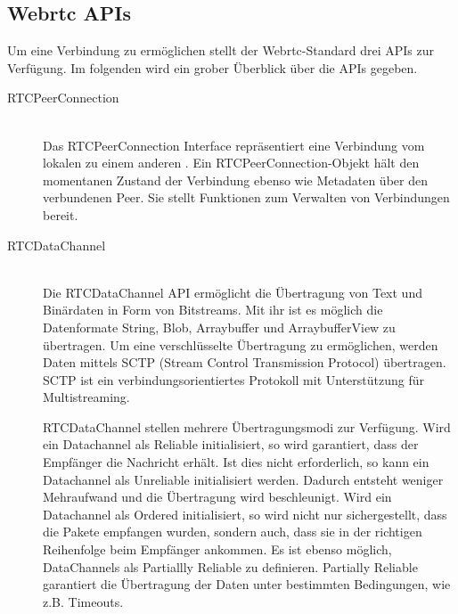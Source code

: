 \subsection{Webrtc APIs}
Um eine \pTp Verbindung zu ermöglichen stellt der Webrtc-Standard drei APIs zur Verfügung. Im folgenden wird ein grober Überblick über die APIs gegeben.
\begin{description}
\item[RTCPeerConnection]\hfill \\
Das RTCPeerConnection Interface repräsentiert eine Verbindung vom lokalen \client zu einem anderen \client. Ein RTCPeerConnection-Objekt hält den momentanen Zustand der Verbindung ebenso wie Metadaten über den verbundenen Peer. Sie stellt Funktionen zum Verwalten von Verbindungen bereit.



\item[RTCDataChannel]\hfill \\
Die RTCDataChannel API ermöglicht die Übertragung von Text und Binärdaten in Form von Bitstreams. Mit ihr ist es möglich die Datenformate String, Blob, Arraybuffer und ArraybufferView zu übertragen.\cite{rfc-datachannel} Um eine verschlüsselte Übertragung zu ermöglichen, werden Daten mittels SCTP (Stream Control Transmission Protocol) übertragen. SCTP ist ein verbindungsorientiertes Protokoll mit Unterstützung für Multistreaming.\cite{rfc-sctp} 

RTCDataChannel stellen mehrere Übertragungsmodi zur Verfügung. Wird ein Datachannel als Reliable initialisiert, so wird garantiert, dass der Empfänger die Nachricht erhält. Ist dies nicht erforderlich, so kann ein Datachannel als Unreliable initialisiert werden. Dadurch entsteht weniger Mehraufwand und die Übertragung wird beschleunigt. Wird ein Datachannel als Ordered initialisiert, so wird nicht nur sichergestellt, dass die Pakete empfangen wurden, sondern auch, dass sie in der richtigen Reihenfolge beim Empfänger ankommen. Es ist ebenso möglich, DataChannels als Partiallly Reliable zu definieren. Partially Reliable garantiert die Übertragung der Daten unter bestimmten Bedingungen, wie z.B. Timeouts.




\end{description}
